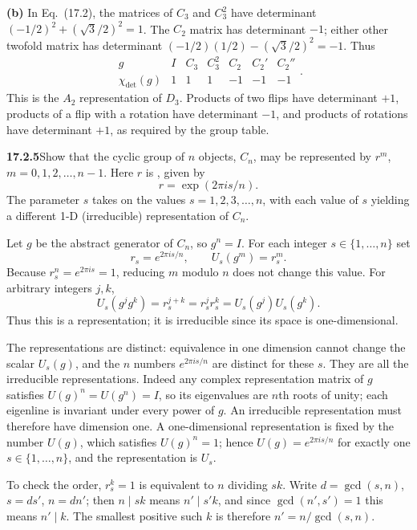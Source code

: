 \textbf{(b)} In Eq.~(17.2), the matrices of $C_3$ and $C_3^2$
have determinant
$(-1/2)^2+(\sqrt3/2)^2=1$.
The $C_2$ matrix has determinant $-1$; either other twofold matrix
has determinant $(-1/2)(1/2)-(\sqrt3/2)^2=-1$.
Thus
\[
\boxed{\begin{array}{c|rrrrrr}
g&I&C_3&C_3^2&C_2&C_2'&C_2''\\\hline
\chi_{\det}(g)&1&1&1&-1&-1&-1
\end{array}}.
\]
This is the $A_2$ representation of $D_3$.
Products of two flips have determinant $+1$, products of a flip
with a rotation have determinant $-1$, and products of rotations
have determinant $+1$, as required by the group table.

\par\bigskip
\noindent\textbf{17.2.5}\quad Show that the cyclic group of $n$
objects, $C_{n}$, may be represented by $r^{m}$,
$m=0,1,2,\ldots,n-1$. Here $r$ is , given by
\[
r=\exp(2\pi is/n).
\]
The parameter $s$ takes on the values $s=1,2,3,\ldots,n$, with each
value of $s$ yielding a different 1-D (irreducible) representation of
$C_{n}$.
\par{}
\solution
Let $g$ be the abstract generator of $C_n$, so $g^n=I$.
For each integer $s\in\{1,\ldots,n\}$ set
\[
r_s=e^{2\pi is/n},\qquad U_s(g^m)=r_s^m.
\]
Because $r_s^n=e^{2\pi is}=1$, reducing $m$ modulo $n$
does not change this value. For arbitrary integers $j,k$,
\[
U_s(g^jg^k)=r_s^{j+k}=r_s^jr_s^k
=U_s(g^j)U_s(g^k).
\]
Thus this is a representation; it is irreducible since its space
is one-dimensional.

The representations are distinct: equivalence in one dimension
cannot change the scalar $U_s(g)$, and the $n$ numbers
$e^{2\pi is/n}$ are distinct for these $s$.
They are all the irreducible representations. Indeed any complex
representation matrix of $g$ satisfies $U(g)^n=U(g^n)=I$, so its
eigenvalues are $n$th roots of unity; each eigenline is invariant
under every power of $g$. An irreducible representation must
therefore have dimension one. A one-dimensional representation is
fixed by the number $U(g)$, which satisfies $U(g)^n=1$; hence
$U(g)=e^{2\pi is/n}$ for exactly one $s\in\{1,\ldots,n\}$, and the
representation is $U_s$.

To check the order, $r_s^k=1$ is equivalent to $n$ dividing $sk$.
Write $d=\gcd(s,n)$, $s=ds'$, $n=dn'$; then $n\mid sk$ means
$n'\mid s'k$, and since $\gcd(n',s')=1$ this means $n'\mid k$.
The smallest positive such $k$ is therefore $n'=n/\gcd(s,n)$.

